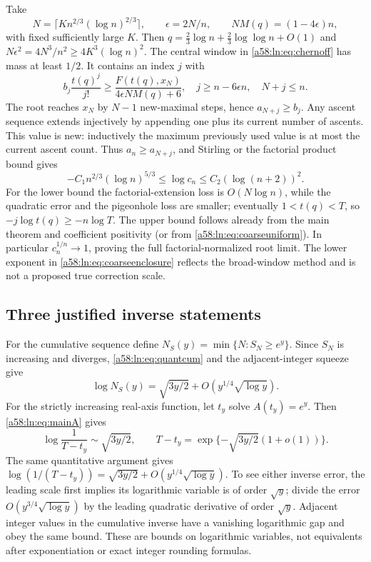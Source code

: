 \documentclass[11pt,letterpaper]{article}
\theoremstyle{remark}
\begin{document}
Take
\[
 N=\lceil K n^{2/3}(\log n)^{2/3}\rceil,\qquad
 \epsilon=2N/n,\qquad NM(q)=(1-4\epsilon)n,
\]
with fixed sufficiently large $K$. Then
$q=\tfrac23\log n+\tfrac23\log\log n+O(1)$ and
$N\epsilon^2=4N^3/n^2\ge4K^3(\log n)^2$.
The central window in \eqref{a58:ln:eq:chernoff} has mass at least $1/2$.
It contains an index $j$ with
\[
 b_j\frac{t(q)^j}{j!}\ge
 \frac{F(t(q),x_N)}{4\epsilon NM(q)+6},\quad
 j\ge n-6\epsilon n,\quad N+j\le n.
\]
The root reaches $x_N$ by $N-1$ new-maximal steps, hence
$a_{N+j}\ge b_j$. Any ascent sequence extends injectively by appending
one plus its current number of ascents. This value is new: inductively
the maximum previously used value is at most the current ascent count.
Thus $a_n\ge a_{N+j}$, and Stirling or the factorial product bound gives
\begin{equation}\label{a58:ln:eq:coarseenclosure}
 -C_1n^{2/3}(\log n)^{5/3}\le\log c_n
 \le C_2(\log(n+2))^2.
\end{equation}
For the lower bound the factorial-extension loss is
$O(N\log n)$, while the quadratic error and the pigeonhole loss are
smaller; eventually $1<t(q)<T$, so $-j\log t(q)\ge-n\log T$.
The upper bound follows already from the main theorem and coefficient
positivity (or from \eqref{a58:ln:eq:coarseuniform}). In particular
$c_n^{1/n}\to1$, proving the full factorial-normalized root limit.
The lower exponent in \eqref{a58:ln:eq:coarseenclosure} reflects the broad-window
method and is not a proposed true correction scale.

\subsection{Three justified inverse statements}
For the cumulative sequence define
$N_S(y)=\min\{N:S_N\ge e^y\}$. Since $S_N$ is increasing and diverges,
\eqref{a58:ln:eq:quantcum} and the adjacent-integer squeeze give
\begin{equation}\label{a58:ln:eq:cuminverse}
 \log N_S(y)=\sqrt{3y/2}+O(y^{1/4}\sqrt{\log y}).
\end{equation}
For the strictly increasing real-axis function, let $t_y$ solve
$A(t_y)=e^y$. Then \eqref{a58:ln:eq:mainA} gives
\begin{equation}\label{a58:ln:eq:realinverse}
 \log\frac1{T-t_y}\sim\sqrt{3y/2},\qquad
 T-t_y=\exp\{-\sqrt{3y/2}(1+o(1))\}.
\end{equation}
The same quantitative argument gives
$\log(1/(T-t_y))=\sqrt{3y/2}+O(y^{1/4}\sqrt{\log y})$.
To see either inverse error, the leading scale first implies its logarithmic
variable is of order $\sqrt y$; divide the error
$O(y^{3/4}\sqrt{\log y})$ by the leading quadratic derivative of order
$\sqrt y$. Adjacent integer values in the cumulative inverse have a
vanishing logarithmic gap and obey the same bound. These are bounds on
logarithmic variables, not equivalents after exponentiation or exact
integer rounding formulas.
\end{document}
